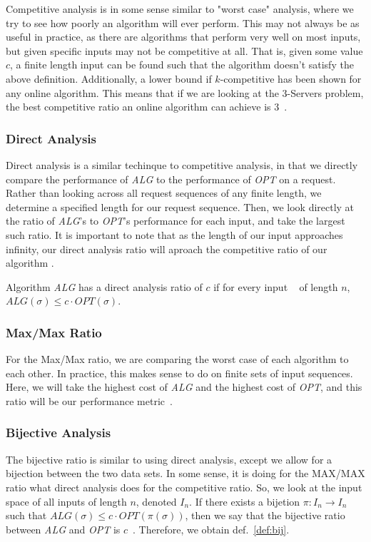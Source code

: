 Competitive analysis is in some sense similar to "worst case" analysis, where we try to see how poorly an algorithm will ever perform. This may not always be as useful in practice, as there are algorithms that perform very well on most inputs, but given specific inputs may not be competitive at all. That is, given some value $c$, a finite length input can be found such that the algorithm doesn't satisfy the above definition. Additionally, a lower bound if $k$-competitive has been shown for any online algorithm. This means that if we are looking at the 3-Servers problem, the best competitive ratio an online algorithm can achieve is 3~\cite{OnlineComp1998}. 

\subsubsection*{Direct Analysis}
\label{sec:Direct}
Direct analysis is a similar techinque to competitive analysis, in that we directly compare the performance of \textit{ALG} to the performance of \textit{OPT} on a request. Rather than looking across all request sequences of any finite length, we determine a specified length for our request sequence. Then, we look directly at the ratio of \textit{ALG}'s to \textit{OPT}'s performance for each input, and take the largest such ratio. It is important to note that as the length of our input approaches infinity, our direct analysis ratio will aproach the competitive ratio of our algorithm .

\begin{definition}
    \label{def:direct}
    Algorithm \textit{ALG} has a direct analysis ratio of $c$ if for every input \s~ of length $n$, $ALG(\sigma) \leq c\cdot OPT(\sigma)$.
\end{definition}

\subsubsection*{Max/Max Ratio}
\label{sec:MaxMax}
For the Max/Max ratio, we are comparing the worst case of each algorithm to each other. In practice, this makes sense to do on finite sets of input sequences. Here, we will take the highest cost of \textit{ALG} and the highest cost of \textit{OPT}, and this ratio will be our performance metric~\cite{MAXMAX2005}. 

\subsubsection*{Bijective Analysis}
\label{sec:Bij}
The bijective ratio is similar to using direct analysis, except we allow for a bijection between the two data sets. In some sense, it is doing for the MAX/MAX ratio what direct analysis does for the competitive ratio. So, we look at the input space of all inputs of length $n$, denoted $I_n$. If there exists a bijetion $\pi:I_n \rightarrow I_n$ such that $ALG(\sigma) \leq c\cdot OPT(\pi(\sigma))$, then  we say that the bijective ratio between \textit{ALG} and \textit{OPT} is $c$~\cite{bij2016}. Therefore, we obtain def.~\ref{def:bij}. 

